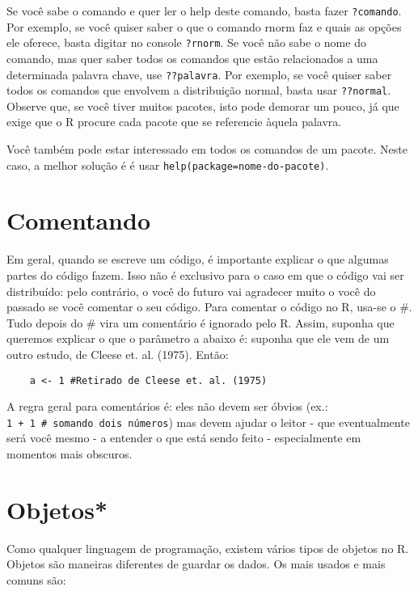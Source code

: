 \documentclass[]{book}
\begin{document}
Se você sabe o comando e quer ler o help deste comando, basta fazer
\texttt{?comando}. Por exemplo, se você quiser saber o que o comando
rnorm faz e quais as opções ele oferece, basta digitar no console
\texttt{?rnorm}. Se você não sabe o nome do comando, mas quer saber
todos os comandos que estão relacionados a uma determinada palavra
chave, use \texttt{??palavra}. Por exemplo, se você quiser saber todos
os comandos que envolvem a distribuição normal, basta usar
\texttt{??normal}. Observe que, se você tiver muitos pacotes, isto pode
demorar um pouco, já que exige que o R procure cada pacote que se
referencie àquela palavra.

Você também pode estar interessado em todos os comandos de um pacote.
Neste caso, a melhor solução é é usar
\texttt{help(package=\textasciigrave{}\textasciigrave{}nome-do-pacote\textquotesingle{}\textquotesingle{})}.

\section{Comentando}\label{comentando}

Em geral, quando se escreve um código, é importante explicar o que
algumas partes do código fazem. Isso não é exclusivo para o caso em que
o código vai ser distribuído: pelo contrário, o você do futuro vai
agradecer muito o você do passado se você comentar o seu código. Para
comentar o código no R, usa-se o \#. Tudo depois do \# vira um
comentário é ignorado pelo R. Assim, suponha que queremos explicar o que
o parâmetro a abaixo é: suponha que ele vem de um outro estudo, de
Cleese et. al. (1975). Então:

\begin{verbatim}
    a <- 1 #Retirado de Cleese et. al. (1975)
\end{verbatim}

A regra geral para comentários é: eles não devem ser óbvios (ex.:
\texttt{1\ +\ 1\ \#\ somando\ dois\ números}) mas devem ajudar o leitor
- que eventualmente será você mesmo - a entender o que está sendo feito
- especialmente em momentos mais obscuros.

\section{Objetos*}\label{objetos}

Como qualquer linguagem de programação, existem vários tipos de objetos
no R. Objetos são maneiras diferentes de guardar os dados. Os mais
usados e mais comuns são:
\end{document}

